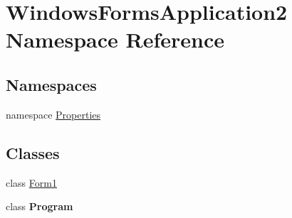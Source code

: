 \hypertarget{namespace_windows_forms_application2}{}\section{Windows\+Forms\+Application2 Namespace Reference}
\label{namespace_windows_forms_application2}
\subsection*{Namespaces}
\begin{DoxyCompactItemize}
\item 
namespace \hyperlink{namespace_windows_forms_application2_1_1_properties}{Properties}
\end{DoxyCompactItemize}
\subsection*{Classes}
\begin{DoxyCompactItemize}
\item 
class \hyperlink{class_windows_forms_application2_1_1_form1}{Form1}
\item 
class {\bfseries Program}
\end{DoxyCompactItemize}
